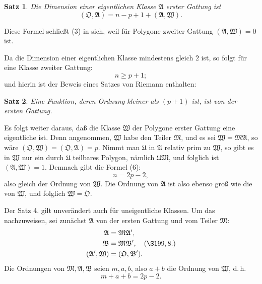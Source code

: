 \documentclass[12pt,a4paper]{article}
\newtheorem*{satz}{Satz}
\begin{document}
\begin{satz}
Die Dimension einer eigentlichen Klasse $\mathfrak{A}$ erster Gattung ist
\begin{equation}\label{eq:199-6}
(\mathfrak{O}, \mathfrak{A}) = n - p + 1 + (\mathfrak{A}, \mathfrak{W}).
\end{equation}
\end{satz}

Diese Formel schließt (3) in sich, weil für Polygone zweiter Gattung $(\mathfrak{A}, \mathfrak{W}) = 0$ ist.

Da die Dimension einer eigentlichen Klasse mindestens gleich $2$ ist, so folgt für eine Klasse zweiter Gattung:
\[
n \geq p + 1;
\]
und hierin ist der Beweis eines Satzes von Riemann enthalten:

\begin{satz}
Eine Funktion, deren Ordnung kleiner als $(p + 1)$ ist, ist von der ersten Gattung.
\end{satz}

Es folgt weiter daraus, daß die Klasse $\mathfrak{W}$ der Polygone erster Gattung eine eigentliche ist. Denn angenommen, $\mathfrak{W}$ habe den Teiler $\mathfrak{M}$, und es sei $\mathfrak{W} = \mathfrak{M}\mathfrak{A}$, so wäre $(\mathfrak{O}, \mathfrak{W}) = (\mathfrak{O}, \mathfrak{A}) = p$. Nimmt man $\mathfrak{U}$ in $\mathfrak{A}$ relativ prim zu $\mathfrak{W}$, so gibt es in $\mathfrak{W}$ nur ein durch $\mathfrak{U}$ teilbares Polygon, nämlich $\mathfrak{U}\mathfrak{M}$, und folglich ist $(\mathfrak{A}, \mathfrak{W}) = 1$. Demnach gibt die Formel (6):
\[
n = 2p - 2,
\]
also gleich der Ordnung von $\mathfrak{W}$. Die Ordnung von $\mathfrak{A}$ ist also ebenso groß wie die von $\mathfrak{W}$, und folglich $\mathfrak{W} = \mathfrak{O}$.

Der Satz 4. gilt unverändert auch für uneigentliche Klassen. Um das nachzuweisen, sei zunächst $\mathfrak{A}$ von der ersten Gattung und vom Teiler $\mathfrak{M}$:
\begin{equation}\label{eq:199-7}
\begin{aligned}
\mathfrak{A} &= \mathfrak{M}\mathfrak{A}',\\
\mathfrak{B} &= \mathfrak{M}\mathfrak{B}', \quad (\S 199, 8.)\\
(\mathfrak{A}', \mathfrak{W}) &= (\mathfrak{O}, \mathfrak{B}').
\end{aligned}
\end{equation}
Die Ordnungen von $\mathfrak{M}, \mathfrak{A}, \mathfrak{B}$ seien $m, a, b$, also $a + b$ die Ordnung von $\mathfrak{W}$, d.\,h.
\begin{equation}\label{eq:199-8}
m + a + b = 2p - 2.
\end{equation}
\end{document}
